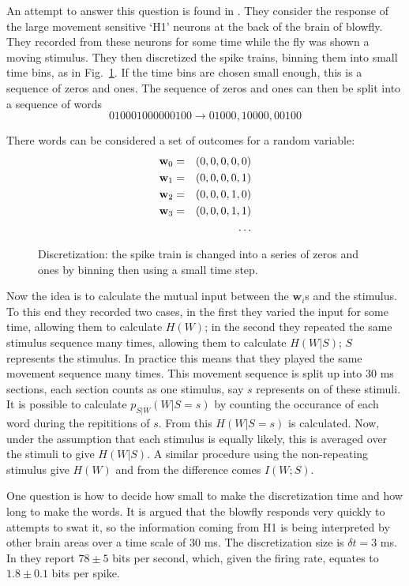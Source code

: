 \documentclass[12pt]{article}
\begin{document}
An attempt to answer this question is found in
\cite{StrongEtAl1998}. They consider the response of the large
movement sensitive \lq{}H1\rq{} neurons at the back of the brain of
blowfly. They recorded from these neurons for some time while the fly
was shown a moving stimulus. They then discretized the spike trains,
binning them into small time bins, as in
Fig.~\ref{fig_discretization}. If the time bins are chosen small
enough, this is a sequence of zeros and ones. The sequence of zeros
and ones can then be split into a sequence of words
\begin{equation}
010001000000100\rightarrow 01000,10000,00100
\end{equation}

\newpage
There words can be considered a set of outcomes for a random variable:
\begin{eqnarray}
\textbf{w}_0&=&(0,0,0,0,0)\cr
\textbf{w}_1&=&(0,0,0,0,1)\cr
\textbf{w}_2&=&(0,0,0,1,0)\cr
\textbf{w}_3&=&(0,0,0,1,1)\cr
&&\ldots
\end{eqnarray}

\begin{figure}[htb]
\begin{center}

\end{center}
\caption{Discretization: the spike train is changed into a series of
  zeros and ones by binning then using a small time
  step.\label{fig_discretization}}
\end{figure}

Now the idea is to calculate the mutual input between the
$\textbf{w}_i$s and the stimulus. To this end they recorded two cases,
in the first they varied the input for some time, allowing them to
calculate $H(W)$; in the second they repeated the same stimulus
sequence many times, allowing them to calculate $H(W|S)$; $S$
represents the stimulus. In practice this means that they played the
same movement sequence many times. This movement sequence is split up
into 30 ms sections, each section counts as one stimulus, say $s$
represents on of these stimuli. It is possible to calculate
$p_{S|W}(W|S=s)$ by counting the occurance of each word during the
repititions of $s$. From this $H(W|S=s)$ is calculated. Now, under the
assumption that each stimulus is equally likely, this is averaged over
the stimuli to give $H(W|S)$. A similar procedure using the
non-repeating stimulus give $H(W)$ and from the difference comes
$I(W;S)$.

One question is how to decide how small to make the discretization
time and how long to make the words. It is argued that the blowfly
responds very quickly to attempts to swat it, so the information
coming from H1 is being interpreted by other brain areas over a time
scale of 30 ms. The discretization size is $\delta t=3$ ms. In
\cite{StrongEtAl1998} they report $78\pm 5$ bits per second, which,
given the firing rate, equates to $1.8\pm 0.1$ bits per
spike. 
\end{document}
